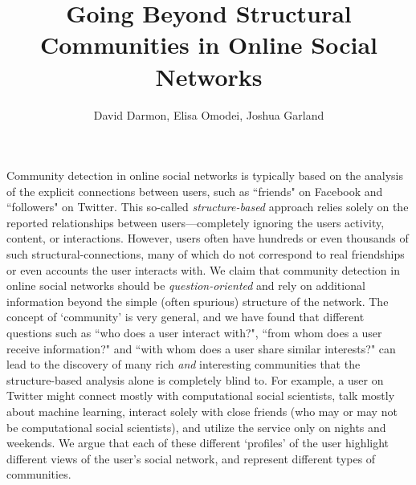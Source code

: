 \documentclass[10pt,a4paper]{article}
\title{Going Beyond Structural Communities in Online Social Networks}
\author{David Darmon, Elisa Omodei, Joshua Garland}
\date{}
\begin{document}
\maketitle




Community detection in online social networks is typically based on the analysis of the explicit connections between users, such as ``friends" on Facebook and ``followers" on Twitter. This so-called \emph{structure-based} approach relies solely on the reported relationships between users---completely ignoring the users activity, content, or interactions. However, users often have hundreds or even thousands of such structural-connections, many of which do not correspond to real friendships or even accounts the user interacts with. We claim that community detection in online social networks should be \emph{question-oriented} and rely on additional information beyond the simple (often spurious) structure of the network. The concept of `community' is very general, and we have found that different questions such as ``who does a user interact with?", ``from whom does a user receive information?" and ``with whom does a user share similar interests?" can lead to the discovery of many rich \emph{and} interesting communities that the structure-based analysis alone is completely blind to. 
For example, a user on Twitter might connect mostly with computational social scientists, talk mostly about machine learning, interact solely with close friends (who may or may not be computational social scientists), and utilize the service only on nights and weekends. We argue that each of these different `profiles' of the user highlight different views of the user's social network, and represent different types of communities. 
\end{document}
